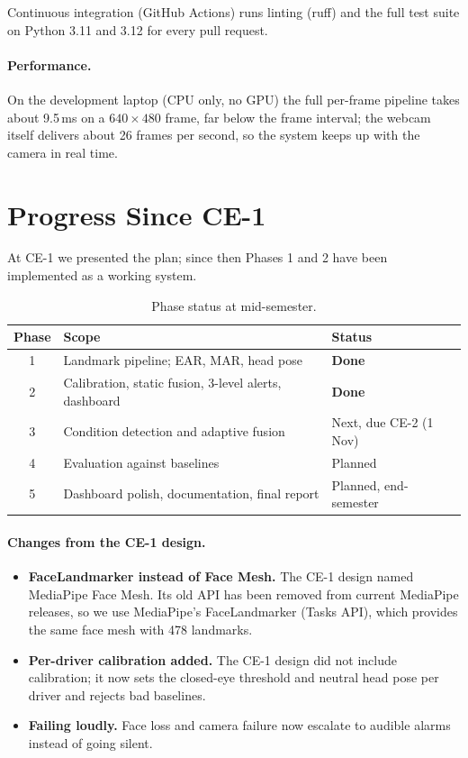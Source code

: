 \documentclass[12pt,a4paper]{article}
\begin{document}
Continuous integration (GitHub Actions) runs linting (ruff) and the full test suite on Python 3.11 and 3.12 for every pull request.

\paragraph{Performance.} On the development laptop (CPU only, no GPU) the full per-frame pipeline takes about 9.5\,ms on a $640\times480$ frame, far below the frame interval; the webcam itself delivers about 26 frames per second, so the system keeps up with the camera in real time.

\section{Progress Since CE-1}

At CE-1 we presented the plan; since then Phases 1 and 2 have been implemented as a working system.

\begin{table}[htbp]
\centering
\caption{Phase status at mid-semester.}
\label{tab:status}
\begin{tabularx}{\textwidth}{cXl}
\toprule
Phase & Scope & Status \\
\midrule
1 & Landmark pipeline; EAR, MAR, head pose & \textbf{Done} \\
2 & Calibration, static fusion, 3-level alerts, dashboard & \textbf{Done} \\
3 & Condition detection and adaptive fusion & Next, due CE-2 (1 Nov) \\
4 & Evaluation against baselines & Planned \\
5 & Dashboard polish, documentation, final report & Planned, end-semester \\
\bottomrule
\end{tabularx}
\end{table}

\paragraph{Changes from the CE-1 design.}
\begin{itemize}
\item \textbf{FaceLandmarker instead of Face Mesh.} The CE-1 design named MediaPipe Face Mesh. Its old API has been removed from current MediaPipe releases, so we use MediaPipe's FaceLandmarker (Tasks API), which provides the same face mesh with 478 landmarks.
\item \textbf{Per-driver calibration added.} The CE-1 design did not include calibration; it now sets the closed-eye threshold and neutral head pose per driver and rejects bad baselines.
\item \textbf{Failing loudly.} Face loss and camera failure now escalate to audible alarms instead of going silent.
\end{itemize}
\end{document}
